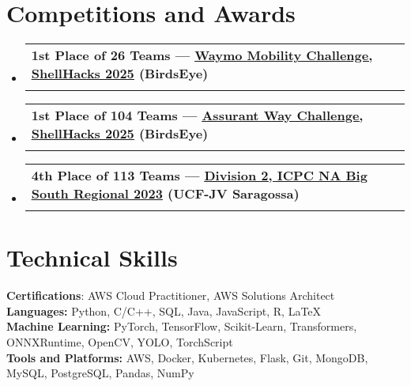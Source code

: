 \documentclass[letterpaper,11pt]{article}
\makeatletter
\newcommand{\resumeSubheading}[4]{
  \vspace{-2pt}\item
    \begin{tabular*}{0.97\textwidth}[t]{l@{\extracolsep{\fill}}r}
      \textbf{#1} & #2 \\
      \textit{\small#3} & \textit{\small #4} \\
    \end{tabular*}\vspace{-7pt}
}
\newcommand{\resumeSubHeadingListStart}{\begin{itemize}[leftmargin=0.15in, label={}]}
\newcommand{\resumeSubHeadingListEnd}{\end{itemize}}
\makeatother
\begin{document}
\section{Competitions and Awards}
  \resumeSubHeadingListStart
    \resumeSubheading
    {1st Place of 26 Teams --- \href{https://devpost.com/software/birdseye-ck0j12}{\uline{Waymo Mobility Challenge, ShellHacks 2025}} (BirdsEye)}{}{}{}
    \vspace{-1em}
    \resumeSubheading
    {1st Place of 104 Teams --- \href{https://devpost.com/software/birdseye-ck0j12}{\uline{Assurant Way Challenge, ShellHacks 2025}} (BirdsEye)}{}{}{}
    \vspace{-1em}
    \resumeSubheading
    {4th Place of 113 Teams --- \href{https://nasouth23.kattis.com/contests/nasouth23d2hidden/standings}{\uline{Division 2, ICPC NA Big South Regional 2023}} (UCF-JV Saragossa)}{}{}{}
  \resumeSubHeadingListEnd

\section{Technical Skills}
  \begin{itemize}[leftmargin=0.15in, label={}]
    \small{\item{
      \textbf{Certifications}: AWS Cloud Practitioner, AWS Solutions Architect \\
      \textbf{Languages:}{ Python, C/C++, SQL, Java, JavaScript, R, LaTeX} \\
      \textbf{Machine Learning:}{ PyTorch, TensorFlow, Scikit-Learn, Transformers, ONNXRuntime, OpenCV, YOLO, TorchScript} \\
      \textbf{Tools and Platforms:}{ AWS, Docker, Kubernetes, Flask, Git, MongoDB, MySQL, PostgreSQL, Pandas, NumPy}
    }}
  \end{itemize}
\end{document}
